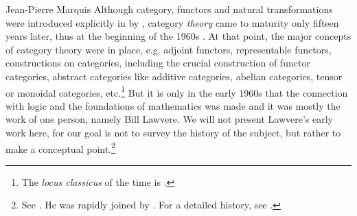 \begin{artengenv}{Jean-Pierre Marquis}
Although category, functors and natural transformations were introduced explicitly  in \cite*{EilMac1945} by \citeauthor{EilMac1945}, category \emph{theory} came to maturity only fifteen years later, thus at the beginning of the 1960s  \parencite[for more on this history, see, for instance][]{LandryMarquis2005,Kromer2007,Marquis2009,Rodin2014}. At that point, the major concepts of category theory were in place, e.g. adjoint functors, representable functors, constructions on categories, including the crucial construction of functor categories, abstract categories like additive categories, abelian categories, tensor or monoidal categories, etc.\footnote{The \emph{locus classicus} of the time is \parencite{MacLane1965}.} But it is only in the early 1960s that the connection with logic and the foundations of mathematics was made and it was mostly the work of one person, namely Bill Lawvere. We will not present Lawvere's early work here, for our goal is not to survey the history of the subject, but rather to make a conceptual point.\footnote{See \parencite{Lawvere1963,Lawvere1966a,Lawvere1967,Lawvere1969a,Lawvere1970,Lawvere1971}. He was rapidly joined by \parencite{Freyd1966,Linton1966,Lambek1968a,Lambek1968b,Lambek1969,Lambek1972}. For a detailed history, see \parencite{Marquis2012}.} 


\end{artengenv}
